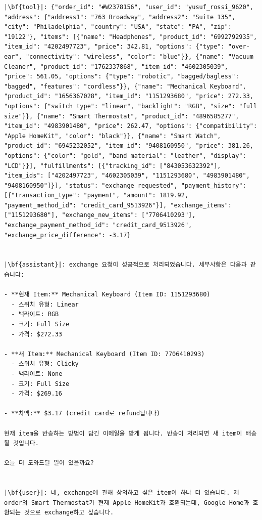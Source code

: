 \begin{longlisting}
\begin{verbatim}
|\bf{tool}|: {"order_id": "#W2378156", "user_id": "yusuf_rossi_9620", "address": {"address1": "763 Broadway", "address2": "Suite 135", "city": "Philadelphia", "country": "USA", "state": "PA", "zip": "19122"}, "items": [{"name": "Headphones", "product_id": "6992792935", "item_id": "4202497723", "price": 342.81, "options": {"type": "over-ear", "connectivity": "wireless", "color": "blue"}}, {"name": "Vacuum Cleaner", "product_id": "1762337868", "item_id": "4602305039", "price": 561.05, "options": {"type": "robotic", "bagged/bagless": "bagged", "features": "cordless"}}, {"name": "Mechanical Keyboard", "product_id": "1656367028", "item_id": "1151293680", "price": 272.33, "options": {"switch type": "linear", "backlight": "RGB", "size": "full size"}}, {"name": "Smart Thermostat", "product_id": "4896585277", "item_id": "4983901480", "price": 262.47, "options": {"compatibility": "Apple HomeKit", "color": "black"}}, {"name": "Smart Watch", "product_id": "6945232052", "item_id": "9408160950", "price": 381.26, "options": {"color": "gold", "band material": "leather", "display": "LCD"}}], "fulfillments": [{"tracking_id": ["843053632392"], "item_ids": ["4202497723", "4602305039", "1151293680", "4983901480", "9408160950"]}], "status": "exchange requested", "payment_history": [{"transaction_type": "payment", "amount": 1819.92, "payment_method_id": "credit_card_9513926"}], "exchange_items": ["1151293680"], "exchange_new_items": ["7706410293"], "exchange_payment_method_id": "credit_card_9513926", "exchange_price_difference": -3.17}


|\bf{assistant}|: exchange 요청이 성공적으로 처리되었습니다. 세부사항은 다음과 같습니다:

- **현재 Item:** Mechanical Keyboard (Item ID: 1151293680)
  - 스위치 유형: Linear
  - 백라이트: RGB
  - 크기: Full Size
  - 가격: $272.33

- **새 Item:** Mechanical Keyboard (Item ID: 7706410293)
  - 스위치 유형: Clicky
  - 백라이트: None
  - 크기: Full Size
  - 가격: $269.16

- **차액:** $3.17 (credit card로 refund됩니다)

현재 item을 반송하는 방법이 담긴 이메일을 받게 됩니다. 반송이 처리되면 새 item이 배송될 것입니다.

오늘 더 도와드릴 일이 있을까요?


|\bf{user}|: 네, exchange에 관해 상의하고 싶은 item이 하나 더 있습니다. 제 order의 Smart Thermostat가 현재 Apple HomeKit과 호환되는데, Google Home과 호환되는 것으로 exchange하고 싶습니다.



\end{verbatim}
\end{longlisting}
